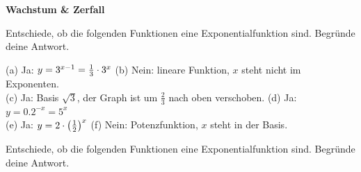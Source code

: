 \documentclass[11pt]{exam}
\newcommand{\theme}{Wachstum \& Zerfall}
\begin{document}
\fontsize{14}{14}\selectfont
\begin{center}
    \huge\bf\theme
\end{center}

\begin{questions}
\question[3]
Entschiede, ob die folgenden Funktionen eine Exponentialfunktion sind. Begründe deine Antwort.
{\begin{solution}
		(a) Ja: $y=3^{x-1}=\frac{1}{3}\cdot3^x$ \quad (b) Nein: lineare Funktion, $x$ steht nicht im Exponenten.\\
		(c) Ja: Basis $\sqrt{3}$, der Graph ist um $\frac{2}{3}$ nach oben verschoben. \quad (d) Ja: $y=0.2^{-x}=5^x$\\
		(e) Ja: $y=2\cdot\left(\frac{1}{2}\right)^x$ \quad (f) Nein: Potenzfunktion, $x$ steht in der Basis.
\end{solution}}
{}

\question[3]
Entschiede, ob die folgenden Funktionen eine Exponentialfunktion sind. Begründe deine Antwort.
\end{questions}
\end{document}
